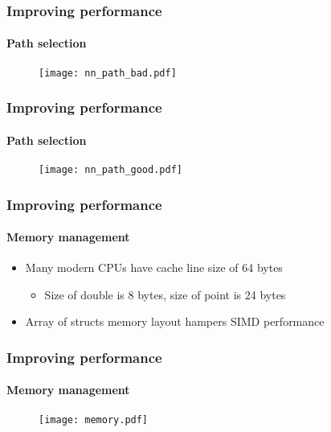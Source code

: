 \begin{frame}
  \frametitle{Improving performance}
  \framesubtitle{Path selection}

  \begin{figure}
    \centering
    \texttt{[image: nn\_path\_bad.pdf]}
  \end{figure}

\end{frame}

\begin{frame}
  \frametitle{Improving performance}
  \framesubtitle{Path selection}

  \begin{figure}
    \centering
    \texttt{[image: nn\_path\_good.pdf]}
  \end{figure}

\end{frame}

\begin{frame}
  \frametitle{Improving performance}
  \framesubtitle{Memory management}

  \begin{itemize}
    \item Many modern CPUs have cache line size of 64 bytes
      \begin{itemize}
        \item Size of double is 8 bytes, size of point is 24 bytes
      \end{itemize}
    \item Array of structs memory layout hampers SIMD performance 
  \end{itemize}

\end{frame}

\begin{frame}
  \frametitle{Improving performance}
  \framesubtitle{Memory management}

  \begin{figure}
    \centering
    \texttt{[image: memory.pdf]}
  \end{figure}

\end{frame}
